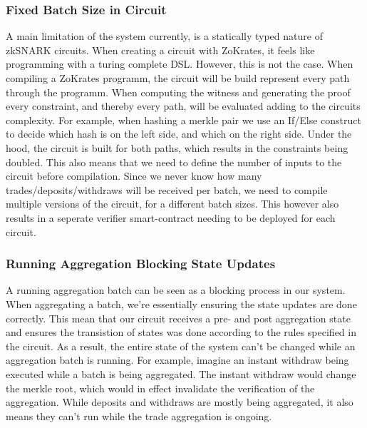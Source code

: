 \documentclass[../../thesis.tex]{subfiles}
\begin{document}
\subsubsection{Fixed Batch Size in Circuit}
A main limitation of the system currently, is a statically typed nature of zkSNARK circuits. When creating a circuit with ZoKrates, it feels like programming with a turing complete DSL. However, this is not the case. When compiling a ZoKrates programm, the circuit will be build represent every path through the programm. When computing the witness and generating the proof every constraint, and thereby every path, will be evaluated adding to the circuits complexity. For example, when hashing a merkle pair we use an If/Else construct to decide which hash is on the left side, and which on the right side. Under the hood, the circuit is built for both paths, which results in the constraints being doubled. This also means that we need to define the number of inputs to the circuit before compilation. Since we never know how many trades/deposits/withdraws will be received per batch, we need to compile multiple versions of the circuit, for a different batch sizes. This however also results in a seperate verifier smart-contract needing to be deployed for each circuit.

\subsubsection{Running Aggregation Blocking State Updates}
A running aggregation batch can be seen as a blocking process in our system. When aggregating a batch, we're essentially ensuring the state updates are done correctly. This mean that our circuit receives a pre- and post aggregation state and ensures the transistion of states was done according to the rules specified in the circuit. As a result, the entire state of the system can't be changed while an aggregation batch is running. For example, imagine an instant withdraw being executed while a batch is being aggregated. The instant withdraw would change the merkle root, which would in effect invalidate the verification of the aggregation. While deposits and withdraws are mostly being aggregated, it also means they can't run while the trade aggregation is ongoing. 
\end{document}
